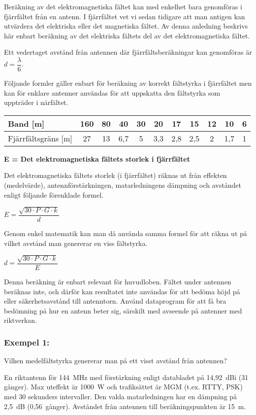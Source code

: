 Beräkning av det elektromagnetiska fältet kan med enkelhet bara
genomföras i fjärrfältet från en antenn.
I fjärrfältet vet vi sedan tidigare att man antigen kan utvärdera det
elektriska eller det magnetiska fältet.
Av denna anledning beskrivs här enbart beräkning av det elektriska fältets del av
det elektromagnetiska fältet.

Ett vedertaget avstånd från antennen där fjärrfältsberäkningar kan genomföras
är \(d=\dfrac{\lambda}{6}\).

Följande formler gäller enbart för beräkning av korrekt fältstyrka i
fjärrfältet men kan för enklare antenner användas för att uppskatta den
fältstyrka som uppträder i närfältet.

\begin{tabular}{|l|c|c|c|c|c|c|c|c|c|c|}
	\hline
	Band [m] & 160 & 80 & 40 & 30 & 20 & 17 & 15 & 12 & 10 & 6 \\ \hline
	Fjärrfältsgräns [m] & 27 & 13 & 6,7 & 5 & 3,3 & 2,8 & 2,5 & 2 & 1,7 & 1 \\ \hline
\end{tabular}

\textbf{E = Det elektromagnetiska fältets storlek i fjärrfältet}

Det elektromagnetiska fältets storlek (i fjärrfältet) räknas ut från
effekten (medelvärde), antennförstärkningen, matarledningens dämpning
och avståndet enligt följande förenklade formel.

\(E=\dfrac{\sqrt{30 \cdot P \cdot G \cdot k}}{d}\)

Genom enkel matematik kan man då använda samma formel för att räkna
ut på vilket avstånd man genererar en viss fältstyrka.

\(d=\dfrac{\sqrt{30 \cdot P \cdot G \cdot k}}{E}\)

Denna beräkning är enbart relevant för huvudloben.
Fältet under antennen beräknas inte, och därför kan resultatet inte användas
för att bedöma höjd på eller säkerhetsavstånd till antenntorn.
Använd dataprogram för att få bra bedömning på hur en antenn beter sig,
särskilt med avseende på antenner med riktverkan.

\subsubsection{Exempel 1:}

Vilken medelfältstyrka genererar man på ett visst avstånd från antennen?

En riktantenn för 144~MHz med förstärkning enligt databladet på
14,92~dBi (31 gånger).
Max uteffekt är 1000~W och trafiksättet är MGM (t.ex. RTTY, PSK) med
30 sekunders intervaller.
Den valda matarledningen har en dämpning på 2,5~dB (0,56~gånger).
Avståndet från antennen till beräkningspunkten är 15~m.

